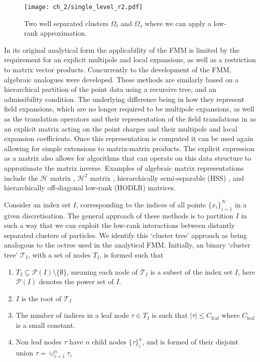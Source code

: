 \begin{figure}
    \centering
    \texttt{[image: ch\_2/single\_level\_r2.pdf]}
    \caption{Two well separated clusters $\Omega_t$ and $\Omega_s$ where we can apply a low-rank approximation.}
    \label{fig:ch_2:single_level_r2}
\end{figure}

In its original analytical form the applicability of the FMM is limited by the requirement for an explicit multipole and local expansions, as well as a restriction to matrix vector products. Concurrently to the development of the FMM, algebraic analogues were developed. These methods are similarly based on a hierarchical partition of the point data using a recursive tree, and an admissibility condition. The underlying difference being in how they represent field expansions, which are no longer required to be multipole expansions, as well as the translation operators and their representation of the field translations in as an explicit matrix acting on the point charges and their multipole and local expansion coefficients. Once this representation is computed it can be used again allowing for simple extensions to matrix-matrix products. The explicit expression as a matrix also allows for algorithms that can operate on this data structure to approximate the matrix inverse. Examples of algebraic matrix representations include the $\mathcal{H}$ matrix \cite{hackbusch1999sparse}, $\mathcal{H}^2$ matrix \cite{borm2003short}, hierarchically semi-separable (HSS) \cite{chandrasekaran2007fast}, and hierarchically off-diagonal low-rank (HODLR) \cite{ambikasaran2013mathcal} matrices. 

Consider an index set $I$, corresponding to the indices of all points $\{ x_i \}_{i=1}^N$ in a given discretisation. The general approach of these methods is to partition $I$ in such a way that we can exploit the low-rank interactions between distantly separated clusters of particles. We identify this `cluster tree' approach as being analogous to the octree used in the analytical FMM. Initially, an binary `cluster tree' $\mathcal{T}_I$, with a set of nodes $T_I$, is formed such that

\begin{enumerate}
    \item $T_I \subseteq \mathcal{P}(I) \setminus \{ \emptyset \}$, meaning each node  of $\mathcal{T}_I$ is a subset of the index set $I$, here $\mathcal{P}(I)$ denotes the power set of $I$.
    \item $I$ is the root of $\mathcal{T}_I$
    \item The number of indices in a leaf node $\tau \in T_I$ is such that $|\tau| \leq C_{\text{leaf}}$ where $C_{\text{leaf}}$ is a small constant.
    \item Non leaf nodes $\tau$ have $n$ child nodes $\{ \tau \}_i^n$, and is formed of their disjoint union $\tau = \cupdot_{i=1}^n \tau_i$ 
\end{enumerate}

